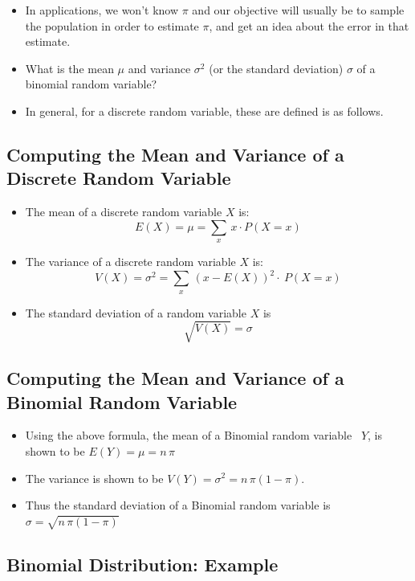 \documentclass[
  letterpaper,
  DIV=11,
  numbers=noendperiod]{scrartcl}
\begin{document}
\begin{itemize}
\item
  In applications, we won't know \(\pi\) and our objective will usually
  be to sample the population in order to {estimate} \(\pi\), and get an
  idea about the {error} in that estimate.
\item
  What is the {mean} \(\mu\) and {variance} \(\sigma^2\) (or the
  standard deviation) \(\sigma\) of a binomial random variable?
\item
  In general, for a {discrete random variable}, these are defined is as
  follows.
\end{itemize}

\subsection{Computing the Mean and Variance of a Discrete Random
Variable}\label{computing-the-mean-and-variance-of-a-discrete-random-variable}

\begin{itemize}
\item
  The {mean} of a discrete random variable \(X\) is:
  \[E(X) = \mu = \sum_x\,x \cdot P(X=x)\]
\item
  The {variance} of a discrete random variable \(X\) is:
  \[V(X) = \sigma^2= \sum_x\,(x - E(X))^2\cdot \ P(X=x)\]
\item
  The {standard deviation} of a random variable \(X\) is
  \[\sqrt{V(X)}=\sigma\]
\end{itemize}

\subsection{Computing the Mean and Variance of a Binomial Random
Variable}\label{computing-the-mean-and-variance-of-a-binomial-random-variable}

\begin{itemize}
\item
  Using the above formula, the {mean} of a Binomial random variable
  ~\(Y\), is shown to be \(E(Y)=\mu = n \, \pi\)
\item
  The {variance} is shown to be \(V(Y) =\sigma^2= n\,\pi(1 - \pi)\).
\item
  Thus the {standard deviation} of a Binomial random variable is
  \(\sigma= \sqrt{n\,\pi(1 - \pi)}\)
\end{itemize}

\subsection{Binomial Distribution:
Example}\label{binomial-distribution-example}
\end{document}
